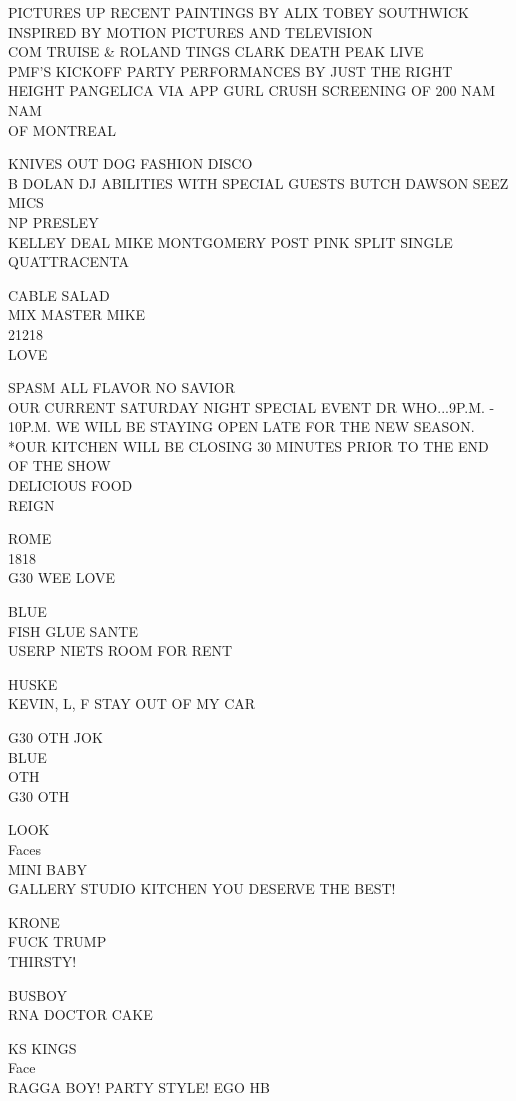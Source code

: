 \documentclass[10pt,letterpaper]{article}
\begin{document}
PICTURES UP RECENT PAINTINGS BY ALIX TOBEY SOUTHWICK INSPIRED BY MOTION PICTURES AND TELEVISION\\
COM TRUISE \& ROLAND TINGS CLARK DEATH PEAK LIVE\\
PMF'S KICKOFF PARTY PERFORMANCES BY JUST THE RIGHT HEIGHT PANGELICA VIA APP GURL CRUSH SCREENING OF 200 NAM NAM\\
OF MONTREAL

KNIVES OUT DOG FASHION DISCO\\
B DOLAN DJ ABILITIES WITH SPECIAL GUESTS BUTCH DAWSON SEEZ MICS\\
NP PRESLEY\\
KELLEY DEAL MIKE MONTGOMERY POST PINK SPLIT SINGLE QUATTRACENTA

CABLE SALAD\\
MIX MASTER MIKE\\
21218\\
LOVE

SPASM ALL FLAVOR NO SAVIOR\\
OUR CURRENT SATURDAY NIGHT SPECIAL EVENT DR WHO...9P.M. {-} 10P.M. WE WILL BE STAYING OPEN LATE FOR THE NEW SEASON.  *OUR KITCHEN WILL BE CLOSING 30 MINUTES PRIOR TO THE END OF THE SHOW\\
DELICIOUS FOOD\\
REIGN

ROME\\
1818\\
G30 WEE LOVE

BLUE\\
FISH GLUE SANTE\\
USERP NIETS ROOM FOR RENT

HUSKE\\
KEVIN, L, F STAY OUT OF MY CAR

G30 OTH JOK\\
BLUE\\
OTH\\
G30 OTH

LOOK\\
Faces\\
MINI BABY\\
GALLERY STUDIO KITCHEN YOU DESERVE THE BEST!

KRONE\\
FUCK TRUMP\\
THIRSTY!

BUSBOY\\
RNA DOCTOR CAKE

KS KINGS\\
Face\\
RAGGA BOY!  PARTY STYLE!  EGO HB
\end{document}
